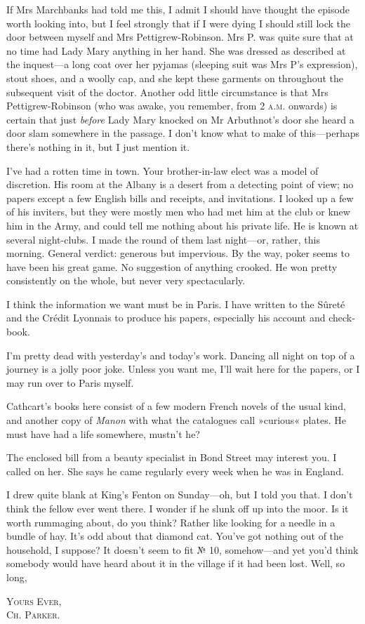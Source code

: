 If Mrs Marchbanks had told me this, I admit I should have thought the episode worth looking into, but I feel strongly that if I were dying I should still lock the door between myself and Mrs Pettigrew-Robinson.  Mrs P. was quite sure that at no time had Lady Mary anything in her hand. She was dressed as described at the inquest—a long coat over her pyjamas (sleeping suit was Mrs P's expression), stout shoes, and a woolly cap, and she kept these garments on throughout the subsequent visit of the doctor. Another odd little circumstance is that Mrs  Pettigrew-Robinson (who was awake, you remember, from 2 \textsc{a.m.} onwards) is certain that just \textit{before} Lady Mary knocked on Mr Arbuthnot's door she heard a door slam somewhere in the passage. I don't know what to make of this—perhaps there's nothing in it, but I just mention it.

I've had a rotten time in town. Your brother-in-law elect was a model of discretion. His room at the Albany is a desert from a detecting point of view; no papers except a few English bills and receipts, and invitations. I looked up a few of his inviters, but they were mostly men who had met him at the club or knew him in the Army, and could tell me nothing about his private life. He is known at several night-clubs. I made the round of them last night—or, rather, this morning. General verdict: generous but impervious. By the way, poker seems to have been his great game. No suggestion of anything crooked.  He won pretty consistently on the whole, but never very spectacularly.

I think the information we want must be in Paris. I have written to the Sûreté and the Crédit Lyonnais to produce his papers, especially his account and check-book.

I'm pretty dead with yesterday's and today's work. Dancing all night on top of a journey is a jolly poor joke. Unless you want me, I'll wait here for the papers, or I may run over to Paris myself.

Cathcart's books here consist of a few modern French novels of the usual kind, and another copy of \textit{Manon} with what the catalogues call »curious« plates. He must have had a life somewhere, mustn't he?

The enclosed bill from a beauty specialist in Bond Street may interest you. I called on her. She says he came regularly every week when he was in England.

I drew quite blank at King's Fenton on Sunday—oh, but I told you that. I don't think the fellow ever went there. I wonder if he slunk off up into the moor. Is it worth rummaging about, do you think?  Rather like looking for a needle in a bundle of hay. It's odd about that diamond cat. You've got nothing out of the household, I suppose?  It doesn't seem to fit № 10, somehow—and yet you'd think somebody would have heard about it in the village if it had been lost. Well, so long,

\begin{flushright}
\textsc{Yours Ever,}\\
\textsc{Ch. Parker.}
\end{flushright}
